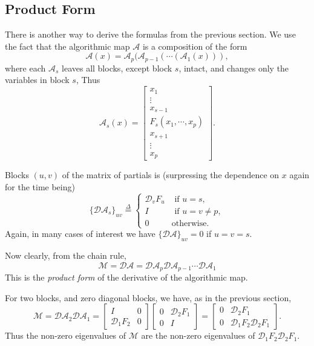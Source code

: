 \documentclass[
  12pt,
]{book}
\begin{document}
\hypertarget{blockrelaxation:rateofconvergence:productform}{%
\subsection{Product Form}\label{blockrelaxation:rateofconvergence:productform}}

There is another way to derive the
formulas from the previous section. We use the fact that the algorithmic map \(\mathcal{A}\)
is a composition of the form
\[
\mathcal{A}(x)=\mathcal{A}_p(\mathcal{A}_{p-1}(\cdots(\mathcal{A}_1(x))),
\]
where each \(\mathcal{A}_s\) leaves all blocks, except block \(s\), intact,
and changes only the variables in block \(s\), Thus
\[
\mathcal{A}_s(x)=
\begin{bmatrix}
x_1\\\vdots\\x_{s-1}\\F_s(x_1,\cdots,x_p)\\x_{s+1}\\\vdots\\x_{p}
\end{bmatrix}.
\]

Blocks \((u,v)\) of the matrix of partials is (surpressing the dependence on \(x\) again for the time being)
\[
\{\mathcal{DA}_s\}_{uv}\mathop{=}\limits^{\Delta}
\begin{cases}
\mathcal{D}_vF_u&\text{ if }u=s,\\
I&\text{ if }u=v\not= p,\\
0&\text{otherwise}.
\end{cases}
\]
Again, in many cases of interest we have \(\{\mathcal{DA}\}_{uv}=0\) if \(u=v=s\).

Now clearly, from the chain rule,
\[
\mathcal{M}=\mathcal{DA}=\mathcal{DA}_p\mathcal{DA}_{p-1}\cdots\mathcal{DA}_1
\]
This is the \emph{product form} of the derivative of the algorithmic map.

For two blocks, and zero diagonal blocks, we have, as in the previous section,
\[
\mathcal{M}=\mathcal{DA}_2\mathcal{DA}_1=\begin{bmatrix}
I&0\\
\mathcal{D}_1F_2&0
\end{bmatrix}
\begin{bmatrix}
0&\mathcal{D}_2F_1\\
0&I
\end{bmatrix}=
\begin{bmatrix}
0&\mathcal{D}_2F_1\\
0&\mathcal{D}_1F_2\mathcal{D}_2F_1
\end{bmatrix}.
\]
Thus the non-zero eigenvalues of \(\mathcal{M}\) are the non-zero eigenvalues
of \(\mathcal{D}_1F_2\mathcal{D}_2F_1\).
\end{document}
